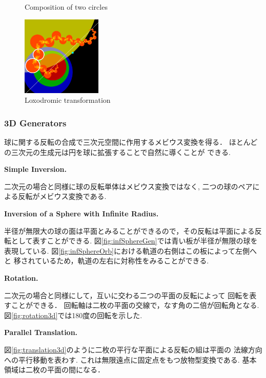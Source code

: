 \begin{figure}[htbp]
\begin{minipage}[]{0.65\hsize}
\begin{minipage}[]{0.22\hsize}
   \label{fig:parabolic2d}
  \end{minipage}
  \caption{Composition of two circles}
 \end{minipage}
 \hspace*{\fill}
 \begin{minipage}[]{0.22\hsize}
  \center
  \includegraphics[width=1.5in, height=1.5in, keepaspectratio]{../img/klein/2diis/loxodromicEdged.pdf}
  \caption{Loxodromic transformation}
  \label{fig:loxodromic2d}
 \end{minipage}
\end{figure}

\subsubsection{3D Generators}

球に関する反転の合成で三次元空間に作用するメビウス変換を得る．
ほとんどの三次元の生成元は円を球に拡張することで自然に導くことが
できる.

\noindent\textbf{Simple Inversion.}

二次元の場合と同様に球の反転単体はメビウス変換ではなく, 二つの球のペアに
よる反転がメビウス変換である.

\noindent\textbf{Inversion of a Sphere with Infinite Radius.}

半径が無限大の球の面は平面とみることができるので，その反転は平面による反
転として表すことができる.
図\ref{fig:infSphereGen}では青い板が半径が無限の球を表現している.
図\ref{fig:infSphereOrb}における軌道の右側はこの板によって左側へと
移されているため，軌道の左右に対称性をみることができる.

\noindent\textbf{Rotation.}

二次元の場合と同様にして，互いに交わる二つの平面の反転によって
回転を表すことができる．
回転軸は二枚の平面の交線で，なす角の二倍が回転角となる.
図\ref{fig:rotation3d}では180度の回転を示した.

\noindent\textbf{Parallel Translation.}

図\ref{fig:translation3d}のように二枚の平行な平面による反転の組は平面の
法線方向への平行移動を表わす.
これは無限遠点に固定点をもつ放物型変換である.
基本領域は二枚の平面の間になる．

